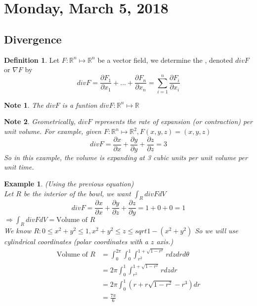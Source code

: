 \documentclass[12pt]{article}
\theoremstyle{plain}
\newtheorem*{note}{Note}
\newtheorem{example}[theorem]{Example}
\theoremstyle{definition}
\newtheorem{definition}[theorem]{Definition}
\begin{document}
\section{Monday, March 5, 2018}

\subsection{Divergence}

\begin{definition}
	Let $F : \mathbb{R}^n \mapsto \mathbb{R}^n$ be a vector field, we determine the \textunderscore, denoted $div F$ or $\nabla F$ by
	$$div F = \frac{\partial F_1}{\partial x_1} + ... + \frac{\partial F_n}{\partial x_n} = \sum_{i=1}^n \frac{\partial F_i}{\partial x_i}$$
\end{definition}

\begin{note}
		The $div F$ is a funtion $div F : \mathbb{R}^n \mapsto \mathbb{R}$
\end{note}
\begin{note}
	Geometrically, $div F$ represents the rate of expansion (or contraction) per unit volume. For example, given $F:\mathbb{R}^n \mapsto \mathbb{R}^2, F(x,y,z) = (x,y,z)$
	$$div F = \frac{\partial x}{\partial x} + \frac{\partial y}{\partial y} + \frac{\partial z}{\partial z} = 3$$
	So in this example, the volume is expanding at 3 cubic units per unit volume per unit time.
\end{note}

\begin{example}
	(Using the previous equation)\\
	Let $R$ be the interior of the bowl, we want $\int_R div F dV$
	$$div F = \frac{\partial x}{\partial x} + \frac{\partial y}{\partial z} + \frac{\partial z}{\partial y} = 1 + 0 + 0 = 1$$
	$\Longrightarrow \int_R div F dV = \text{Volume of $R$}$\\
	We know $R : 0 \leq x^2 + y^2 \leq 1, x^2 + y^2 \leq z \leq sqrt{1 - (x^2 + y^2)}$
	So we will use cylindrical coordinates (polar coordinates with a $z$ axis.)
	\begin{align*}
		\text{Volume of $R$} &=  \int_0^{2\pi} \int^1_0 \int^{1+\sqrt{1-r^2}}_{r^2} rdzdrd\theta\\
		&= 2\pi  \int^1_0 \int^{1+\sqrt{1-r^2}}_{r^2} r dzdr\\
		&=  2\pi  \int^1_0 (r+ r\sqrt{1-r^2} - r^3)dr\\
		&= \frac{7\pi}{6}
	\end{align*}
\end{example}
\end{document}

